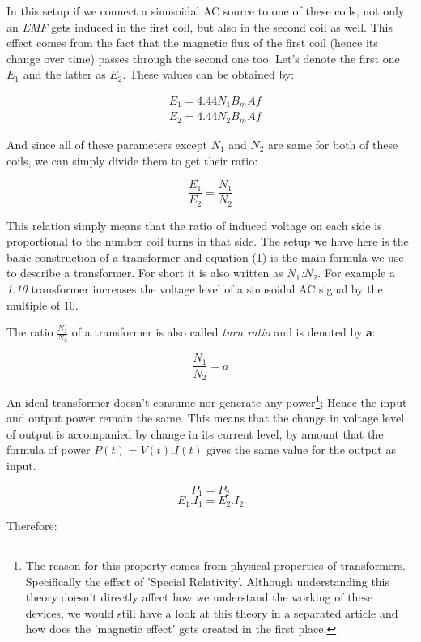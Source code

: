 \documentclass{article}
\begin{document}
	
	In this setup if we connect a sinusoidal AC source to one of these coils, not only an \textit{EMF} gets induced in the first coil, but also in the second coil as well.
	This effect comes from the fact that the magnetic flux of the first coil (hence its change over time) passes through the second one too. 
	Let's denote the first one $E_1$ and the latter as $E_2$.
	These values can be obtained by:
	
	\begin{align*}
	& E_1 = 4.44N_1B_{m}Af \\
	& E_2 = 4.44N_2B_{m}Af
	\end{align*}
	
	And since all of these parameters except $N_1$ and $N_2$ are same for both of these coils, we can simply divide them to get their ratio:
	
	\begin{equation}
	\frac{E_1}{E_2} = \frac{N_1}{N_2}
	\end{equation}
	
	This relation simply means that the ratio of induced voltage on each side is proportional to the number coil turns in that side.
	The setup we have here is the basic construction of a transformer and equation (1) is the main formula we use to describe a transformer.
	For short it is also written as \textit{$N_1$:$N_2$}.
	For example a \textit{1:10} transformer increases the voltage level of a sinusoidal AC signal by the multiple of $10$.
	
	The ratio $\frac{N_1}{N_2}$ of a transformer is also called \textit{turn ratio} and is denoted by \textbf{a}:
	
	$$ \frac{N_1}{N_2} = a $$
	
	An ideal transformer doesn't consume nor generate any power\footnote[1]{The reason for this property comes from physical properties of transformers.
	Specifically the effect of 'Special Relativity'.
	Although understanding this theory doesn't directly affect how we understand the working of these devices, we would still have a look at this theory in a separated article and how does the 'magnetic effect' gets created in the first place.};
	Hence the input and output power remain the same.
	This means that the change in voltage level of output is accompanied by change in its current level, by amount that the formula of power $P(t) = V(t).I(t)$ gives the same value for the output as input. 
	
	$$ P_1 = P_2$$
	$$ E_1.I_1 = E_2.I_2$$

	Therefore:
	
\end{document}
